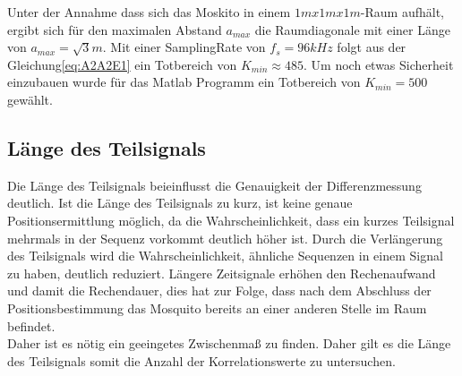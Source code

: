 Unter der Annahme dass sich das Moskito in einem $1m x 1m x 1m$-Raum aufhält, ergibt sich für den maximalen Abstand $a_{max}$ die Raumdiagonale mit einer Länge von $a_{max} = \sqrt{3}m$. Mit einer SamplingRate von $f_s = 96 kHz$ folgt aus der Gleichung\eqref{eq:A2A2E1} ein Totbereich von $K_{min} \approx 485$. Um noch etwas Sicherheit einzubauen wurde für das Matlab Programm ein Totbereich von $K_{min} = 500$ gewählt.

\subsection{Länge des Teilsignals}
Die Länge des Teilsignals beieinflusst die Genauigkeit der Differenzmessung deutlich. Ist die Länge des Teilsignals zu kurz, ist keine genaue Positionsermittlung möglich, da die Wahrscheinlichkeit, dass ein kurzes Teilsignal mehrmals in der Sequenz vorkommt deutlich höher ist. Durch die Verlängerung des Teilsignals wird die Wahrscheinlichkeit, ähnliche Sequenzen in einem Signal zu haben, deutlich reduziert. Längere Zeitsignale erhöhen den Rechenaufwand und damit die Rechendauer, dies hat zur Folge, dass nach dem Abschluss der Positionsbestimmung das Mosquito bereits an einer anderen Stelle im Raum befindet. \\
Daher ist es nötig ein geeingetes Zwischenmaß zu finden. Daher gilt es die Länge des Teilsignals somit die Anzahl der Korrelationswerte zu untersuchen.